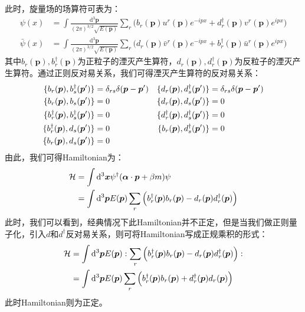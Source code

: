 此时，旋量场的场算符可表为：
\begin{equation}
\begin{split}
\psi(x)&=\int\frac{\mathrm{d}^3\boldsymbol{p}}{(2\pi)^{3/2}\sqrt{E({\boldsymbol{p}})}}\sum_{r}\Big(b_r(\boldsymbol{p})u^r(\boldsymbol{p})e^{-ipx}+d^\dagger_r(\boldsymbol{p})v^r(\boldsymbol{p})e^{ipx}\Big)\\
\bar{\psi}(x)&=\int\frac{\mathrm{d}^3\boldsymbol{p}}{(2\pi)^{3/2}\sqrt{E({\boldsymbol{p}})}}\sum_{r}\Big(d_r(\boldsymbol{p})\bar{v}^r(\boldsymbol{p})e^{-ipx}+b^\dagger_r(\boldsymbol{p})\bar{u}^r(\boldsymbol{p})e^{ipx}\Big)
\end{split}
\end{equation}
其中$b_r(\boldsymbol{p}),b^\dagger_r(\boldsymbol{p})$为正粒子的湮灭产生算符，$d_r(\boldsymbol{p}),d^\dagger_r(\boldsymbol{p})$为反粒子的湮灭产生算符。通过正则反对易关系，我们可得湮灭产生算符的反对易关系：
\begin{align}
\{b_r(\boldsymbol{p}),b^\dagger_s(\boldsymbol{p}')\}&=\delta_{rs}\delta(\boldsymbol{p}-\boldsymbol{p}')&\{d_r(\boldsymbol{p}),d^\dagger_s(\boldsymbol{p}')\}&=\delta_{rs}\delta(\boldsymbol{p}-\boldsymbol{p}')\notag\\
\{b_r(\boldsymbol{p}),b_s(\boldsymbol{p}')\}&=0&\{d_r(\boldsymbol{p}),d_s(\boldsymbol{p}')\}&=0\notag\\
\{b^\dagger_r(\boldsymbol{p}),b^\dagger_s(\boldsymbol{p}')\}&=0&\{d^\dagger_r(\boldsymbol{p}),d^\dagger_s(\boldsymbol{p}')\}&=0\notag\\
\{b^\dagger_r(\boldsymbol{p}),d_s(\boldsymbol{p}')\}&=0&\{b_r(\boldsymbol{p}),d^\dagger_s(\boldsymbol{p}')\}&=0\notag\\
\{b_r(\boldsymbol{p}),d_s(\boldsymbol{p}')\}&=0&&
\end{align}
由此，我们可得Hamiltonian为：
\begin{align}
\mathcal{H}&=\int\mathrm{d}^3\boldsymbol{x}\psi^\dagger(\boldsymbol{\alpha}\cdot\boldsymbol{p}+\beta m)\psi\notag\\
&=\int\mathrm{d}^3\boldsymbol{p}E(\boldsymbol{p})\sum_{r}\Big(b^\dagger_r(\boldsymbol{p})b_r(\boldsymbol{p})-d_r(\boldsymbol{p})d^\dagger_r(\boldsymbol{p})\Big)
\end{align}
此时，我们可以看到，经典情况下此Hamiltonian并不正定，但是当我们做正则量子化，引入$d$和$d^\dagger$反对易关系，则可将Hamiltonian写成正规乘积的形式：
\begin{align}
\mathcal{H}&=\int\mathrm{d}^3\boldsymbol{p}E(\boldsymbol{p}):\sum_{r}\Big(b^\dagger_r(\boldsymbol{p})b_r(\boldsymbol{p})-d_r(\boldsymbol{p})d^\dagger_r(\boldsymbol{p})\Big):\notag\\
&=\int\mathrm{d}^3\boldsymbol{p}E(\boldsymbol{p})\sum_{r}\Big(b^\dagger_r(\boldsymbol{p})b_r(\boldsymbol{p})+d^\dagger_r(\boldsymbol{p})d_r(\boldsymbol{p})\Big)
\end{align}
此时Hamiltonian则为正定。

